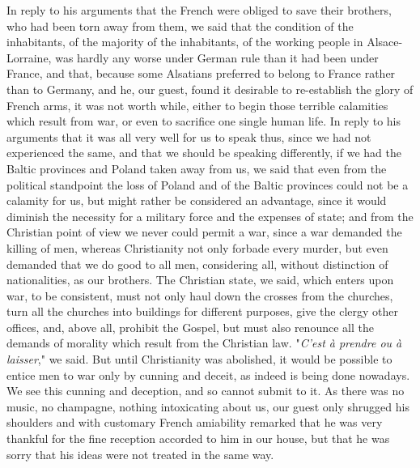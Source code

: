 \documentclass{book}
\begin{document}
In reply to his arguments that the French were obliged to save their brothers, who had been torn away from them, we said that the condition of the inhabitants, of the majority of the inhabitants, of the working people in Alsace-Lorraine, was hardly any worse under German rule than it had been under France, and that, because some Alsatians preferred to belong to France rather than to Germany, and he, our guest, found it desirable to re-establish the glory of French arms, it was not worth while, either to begin those terrible calamities which result from war, or even to sacrifice one single human life. In reply to his arguments that it was all very well for us to speak thus, since we had not experienced the same, and that we should be speaking differently, if we had the Baltic provinces and Poland taken away from us, we said that even from the political standpoint the loss of Poland and of the Baltic provinces could not be a calamity for us, but might rather be considered an advantage, since it would diminish the necessity for a military force and the expenses of state; and from the Christian point of view we never could permit a war, since a war demanded the killing of men, whereas Christianity not only forbade every murder, but even demanded that we do good to all men, considering all, without distinction of nationalities, as our brothers. The Christian state, we said, which enters upon war, to be consistent, must not only haul down the crosses from the churches, turn all the churches into buildings for different purposes, give the clergy other offices, and, above all, prohibit the Gospel, but must also renounce all the demands of morality which result from the Christian law. "\emph{C’est à prendre ou à laisser}," we said. But until Christianity was abolished, it would be possible to entice men to war only by cunning and deceit, as indeed is being done nowadays. We see this cunning and deception, and so cannot submit to it. As there was no music, no champagne, nothing intoxicating about us, our guest only shrugged his shoulders and with customary French amiability remarked that he was very thankful for the fine reception accorded to him in our house, but that he was sorry that his ideas were not treated in the same way.
\end{document}
